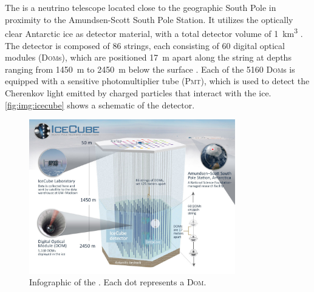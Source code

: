 \section{\icecube{}}
The \icecubeneutrinoobservatory{} is a neutrino telescope
  located close to the geographic South Pole
  in proximity to the Amundsen-Scott South Pole Station.
It utilizes the optically clear Antarctic ice as detector material,
  with a total detector volume of \SI{1}{\cubic\kilo\meter} \cite{icecube_aartsen}.
The detector is composed of \num{86} strings,
  each consisting of \num{60} digital optical modules (\textsc{Dom}s),
    which are positioned
      \SI{17}{\meter} apart along the string
      at depths ranging from \SI{1450}{\meter} to \SI{2450}{\meter} below the surface \cite{icecube_aartsen}.
Each of the \num{5160} \textsc{Dom}s is equipped with a sensitive photomultiplier tube (\textsc{Pmt}),
  which is used to detect the Cherenkov light emitted by charged particles
  that interact with the ice.
%
\autoref{fig:img:icecube} shows a schematic of the \icecube{} detector.



\begin{figure}
  \centering
  \includegraphics[width=0.8\textwidth]{content/img/icecube_detector_schematic.jpg}
  \caption{
    Infographic
    of the \icecubeneutrinoobservatory{}. \cite{icecube_homepage}
    Each dot represents a \textsc{Dom}.
  }
  \label{fig:img:icecube}
\end{figure}



